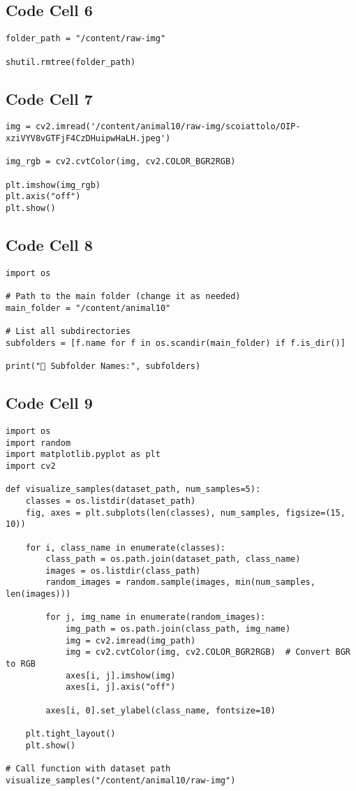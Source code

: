 \documentclass{article}
\begin{document}
\subsection*{Code Cell 6}
\begin{lstlisting}
folder_path = "/content/raw-img"

shutil.rmtree(folder_path)
\end{lstlisting}

\subsection*{Code Cell 7}
\begin{lstlisting}
img = cv2.imread('/content/animal10/raw-img/scoiattolo/OIP-xziVYV8vGTFjF4CzDHuipwHaLH.jpeg')

img_rgb = cv2.cvtColor(img, cv2.COLOR_BGR2RGB)

plt.imshow(img_rgb)
plt.axis("off")
plt.show()
\end{lstlisting}

\subsection*{Code Cell 8}
\begin{lstlisting}
import os

# Path to the main folder (change it as needed)
main_folder = "/content/animal10"

# List all subdirectories
subfolders = [f.name for f in os.scandir(main_folder) if f.is_dir()]

print("📂 Subfolder Names:", subfolders)
\end{lstlisting}

\subsection*{Code Cell 9}
\begin{lstlisting}
import os
import random
import matplotlib.pyplot as plt
import cv2

def visualize_samples(dataset_path, num_samples=5):
    classes = os.listdir(dataset_path)
    fig, axes = plt.subplots(len(classes), num_samples, figsize=(15, 10))

    for i, class_name in enumerate(classes):
        class_path = os.path.join(dataset_path, class_name)
        images = os.listdir(class_path)
        random_images = random.sample(images, min(num_samples, len(images)))

        for j, img_name in enumerate(random_images):
            img_path = os.path.join(class_path, img_name)
            img = cv2.imread(img_path)
            img = cv2.cvtColor(img, cv2.COLOR_BGR2RGB)  # Convert BGR to RGB
            axes[i, j].imshow(img)
            axes[i, j].axis("off")

        axes[i, 0].set_ylabel(class_name, fontsize=10)

    plt.tight_layout()
    plt.show()

# Call function with dataset path
visualize_samples("/content/animal10/raw-img")
\end{lstlisting}
\end{document}
